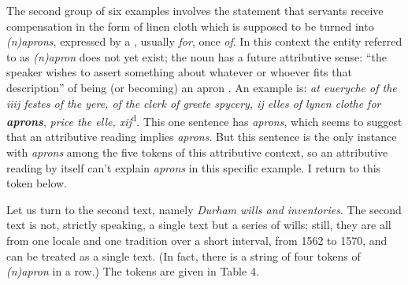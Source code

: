 \documentclass[output=paper,
modfonts
]{LSP/langsci}
\begin{document}
The second group of six examples involves the statement that servants
receive compensation in the form of linen cloth which is supposed to be
turned into \emph{(n)aprons}, expressed by a , usually
\emph{for}, once \emph{of}. In this context the entity referred to as
\emph{(n)apron} does not yet exist; the noun has a future attributive
sense: ``the speaker wishes to assert something about whatever or
whoever fits that description'' of being (or becoming) an apron
\citep[285]{DON}. An example is: \emph{at eueryche of the iiij
festes of the yere, of the clerk of greete spycery, ij elles of lynen
clothe for \textbf{aprons}}, \emph{price the elle,
xij}\textsuperscript{d}. This one sentence has \emph{aprons}, which
seems to suggest that an attributive reading implies \emph{aprons}. But
this sentence is the only instance with \emph{aprons} among the five
tokens of this attributive context, so an attributive reading by itself
can't explain \emph{aprons} in this specific example. I return to this
token below.

Let us turn to the second text, namely \emph{Durham wills and inventories}. The second text is not, strictly speaking,
a single text but a series of wills; still, they are all from one locale
and one tradition over a short interval, from 1562 to 1570, and can be
treated as a single text. (In fact, there is a string of four tokens of
\emph{(n)apron} in a row.) The tokens are given in Table 4.
\end{document}
